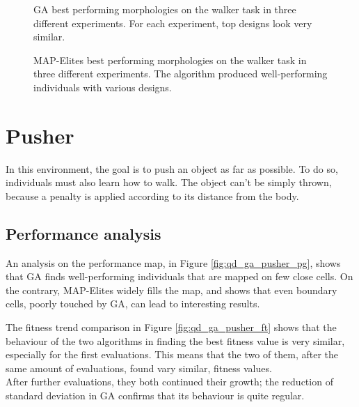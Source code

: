 \begin{figure}[H]
    \centering
    
    \caption{GA best performing morphologies on the walker task in three different experiments. For each experiment, top designs look very similar.}
    \label{fig:ga_walker_topdesigns}
\end{figure}

\begin{figure}[H]
    \centering
    
    \caption{MAP-Elites best performing morphologies on the walker task in three different experiments. The algorithm produced well-performing individuals with various designs.}
    \label{fig:qd_walker_topdesigns}
\end{figure}


\section{Pusher}
In this environment, the goal is to push an object as far as possible. To do so, individuals must also learn how to walk. The object can't be simply thrown, because a penalty is applied according to its distance from the body.

\subsection{Performance analysis}
An analysis on the performance map, in Figure \ref{fig:qd_ga_pusher_pg}, shows that GA finds well-performing individuals that are mapped on few close cells. On the contrary, MAP-Elites widely fills the map, and shows that even boundary cells, poorly touched by GA, can lead to interesting results.

The fitness trend comparison in Figure \ref{fig:qd_ga_pusher_ft} shows that the behaviour of the two algorithms in finding the best fitness value is very similar, especially for the first evaluations. This means that the two of them, after the same amount of evaluations, found vary similar, fitness values.\\
After further evaluations, they both continued their growth; the reduction of standard deviation in GA confirms that its behaviour is quite regular.

